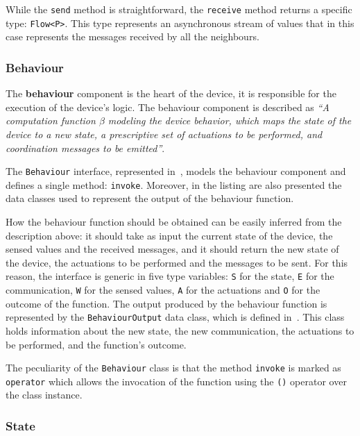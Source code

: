 While the \texttt{send} method is straightforward, the \texttt{receive} method returns a specific type: \texttt{Flow<P>}.
This type represents an asynchronous stream of values that in this case represents the messages received by all the neighbours.

\subsubsection{Behaviour}

The \textbf{behaviour} component is the heart of the device, it is responsible for the execution of the device's logic.
The behaviour component is described as \textit{``A computation function $\beta$
	modeling the device behavior, which maps the state of the device to a new state, a prescriptive set of actuations to be performed,
	and coordination messages to be emitted''}.



The \texttt{Behaviour} interface, represented in~, models the behaviour component and defines a single method:
\texttt{invoke}. Moreover, in the listing are also presented the data classes used to represent the output of the behaviour function.

How the behaviour function should be obtained can be easily inferred from the description above: it should take as input the current state of
the device, the sensed values and the received messages, and it should return the new state of the device, the actuations to be performed and the
messages to be sent. For this reason, the interface is generic in five type variables: \texttt{S} for the state, \texttt{E} for the communication,
\texttt{W} for the sensed values, \texttt{A} for the actuations and \texttt{O} for the outcome of the function.
The output produced by the behaviour function is represented by the \texttt{BehaviourOutput} data class, which is defined
in~. This class holds information about the new state, the new communication, the actuations to be performed, and the
function's outcome.

The peculiarity of the \texttt{Behaviour} class is that the method \texttt{invoke} is marked as \texttt{operator} which allows the invocation of the
function using the \texttt{()} operator over the class instance.

\subsubsection{State}

